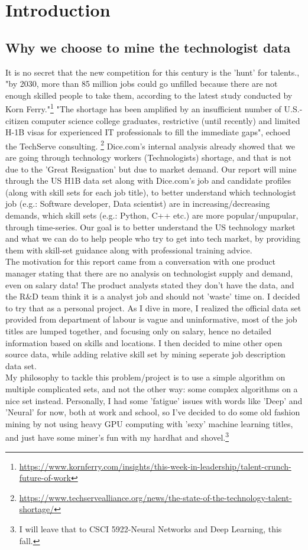 

\section{Introduction} 
\subsection{Why we choose to mine the technologist data}
 It is no secret that the new competition for this century is the 'hunt' for talents., "by 2030, more than 85 million jobs could go unfilled because there are not enough skilled people to take them, according to the latest study conducted by Korn Ferry."\footnote{ \url{https://www.kornferry.com/insights/this-week-in-leadership/talent-crunch-future-of-work}} "The shortage has been amplified by an insufficient number of U.S.-citizen computer science college graduates, restrictive (until recently) and limited H-1B visas for experienced IT professionals to fill the immediate gaps",  echoed the TechServe consulting. \footnote{ \url{https://www.techservealliance.org/news/the-state-of-the-technology-talent-shortage/}}
Dice.com's internal analysis already showed that we are going through technology workers (Technologists) shortage, and that is not due to the 'Great Resignation' but due to market demand. Our report will mine through the US H1B data set along with Dice.com's job and candidate profiles (along with skill sets for each job title),  to better understand which technologist job (e.g.: Software developer, Data scientist) are in increasing/decreasing demands, which skill sets (e.g.: Python, C++ etc.) are more popular/unpupular, through time-series. Our goal is to better understand the US technology market and what we can do to help people who try to get into tech market, by providing them with skill-set guidance along with professional training advice. \\
The motivation for this report came from a conversation with one product manager stating that there are no analysis on technologist supply and demand, even on salary data! The product analysts stated they don't have the data, and the R$\&$D team think it is a analyst job and should not 'waste' time on.  I decided to try that as a personal project. As I dive in more, I realized the official data set provided from department of labour is vague and uninformative, most of the job titles are lumped together, and focusing only on salary, hence no detailed information based on skills and locations. I then decided to mine other open source data, while adding relative skill set by mining seperate job description data set.\\
My philosophy to tackle this problem/project is to use a simple algorithm on multiple complicated sets, and not the other way: some complex algorithms  on a nice set instead. Personally, I had some 'fatigue' issues with words like 'Deep' and 'Neural' for now, both at work and school, so I've decided to do some old fashion mining by not using heavy GPU computing with 'sexy' machine learning titles, and just have some miner's fun with my hardhat and shovel.\footnote{I will leave that to CSCI 5922-Neural Networks and Deep Learning, this fall.}
